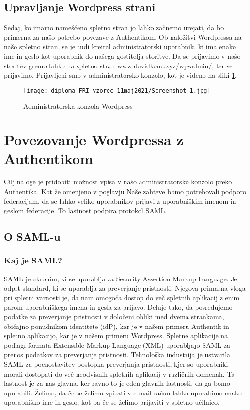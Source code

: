 \documentclass[a4paper,12pt,openright]{book}
\begin{document}
\subsection{Upravljanje Wordpress strani}

Sedaj, ko imamo nameščeno spletno stran jo lahko začnemo urejati, da bo primerna za našo potrebo povezave z Authentikom. Ob naložitvi Wordpressa na našo spletno stran, se je tudi kreiral administratorski uporabnik, ki ima enako ime in geslo kot uporabnik do našega gostitelja storitve. Da se prijavimo v našo storitev gremo lahko na spletno stran \href{www.davidkonc.xyz/wp-admin/}{www.davidkonc.xyz/wp-admin/}, ter se prijavimo.
\newline
Prijavljeni smo v administratorsko konzolo, kot je videno na sliki \ref{fig:adminWord}.

\begin{figure}[H]
\hspace{-2cm}
\texttt{[image: diploma-FRI-vzorec\_11maj2021/Screenshot\_1.jpg]}
\caption{Administratorska konzola Wordpress}
\label{fig:adminWord}
\end{figure}

\section{Povezovanje Wordpressa z Authentikom}

Cilj naloge je pridobiti možnost vpisa v našo administratorsko konzolo preko Authentika. Kot že omenjeno v poglavju Naše zahteve bomo potrebovali podporo federacijam, da se lahko veliko uporabnikov prijavi z uporabniškim imenom in geslom federacije. To lastnost podpira protokol SAML.

\subsection{O SAML-u}

\subsubsection{Kaj je SAML?}
SAML je akronim, ki se uporablja za Security Assertion Markup Language. Je odprt standard, ki se uporablja za preverjanje pristnosti. Njegova primarna vloga pri spletni varnosti je, da nam omogoča dostop do več spletnih aplikacij z enim parom uporabniškega imena in gesla za prijavo. Deluje tako, da posredujemo podatke za preverjanje pristnosti v določeni obliki med dvema strankama, običajno ponudnikom identitete (idP), kar je v našem primeru Authentik in spletno aplikacijo, kar je v našem primeru Wordpress.
Spletne aplikacije na podlagi formata Extensible Markup Language (XML) uporabljajo SAML za prenos podatkov za preverjanje pristnosti.
\newline
Tehnološka industrija je ustvarila SAML za poenostavitev postopka preverjanja pristnosti, kjer so uporabniki morali dostopati do več neodvisnih spletnih aplikacij v različnih domenah. Ta lastnost je za nas glavna, ker ravno to je eden glavnih lastnosti, da ga bomo uporabili. Želimo, da če se želimo vpisati v e-mail račun lahko uporabimo enako uporabniško ime in geslo, kot pa če se želimo prijaviti v spletno učilnico. 
\end{document}
